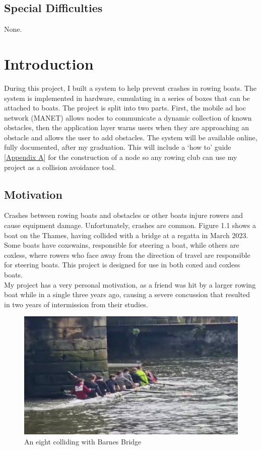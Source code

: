\documentclass[12pt,a4paper]{report}
\newcommand{\newchapter}[2]{
    \setcounter{chapter}{#1}
    \setcounter{section}{0}
    \chapter*{#2}
    \addcontentsline{toc}{chapter}{#1 #2}
}
\begin{document}
\section*{Special Difficulties}
None.



{
\hypersetup{linkcolor=black}
\tableofcontents
}

\newchapter{1}{Introduction}
During this project, I built a system to help prevent crashes in rowing boats. The system is implemented in hardware, cumulating in a series of boxes that can be attached to boats. The project is split into two parts. First, the mobile ad hoc network (MANET) allows nodes to communicate a dynamic collection of known obstacles, then the application layer warns users when they are approaching an obstacle and allows the user to add obstacles. The system will be available online, fully documented, after my graduation. This will include a `how to' guide [\hyperref[appendixA]{Appendix A}] for the construction of a node so any rowing club can use my project as a collision avoidance tool.    

\section{Motivation}	
Crashes between rowing boats and obstacles or other boats injure rowers and cause equipment damage. Unfortunately, crashes are common. Figure 1.1 shows a boat on the Thames, having collided with a bridge at a regatta in March 2023. Some boats have coxswains, responsible for steering a boat, while others are coxless, where rowers who face away from the direction of travel are responsible for steering boats. This project is designed for use in both coxed and coxless boats. \\
My project has a very personal motivation, as a friend was hit by a larger rowing boat while in a single three years ago, causing a severe concussion that resulted in two years of intermission from their studies.
\begin{figure}[h]
\begin{center}
\includegraphics[scale=0.5]{boatCrash.jpg.png}
\end{center}
\caption{An eight colliding with Barnes Bridge \cite{boat}}
\end{figure}
\FloatBarrier
\end{document}
